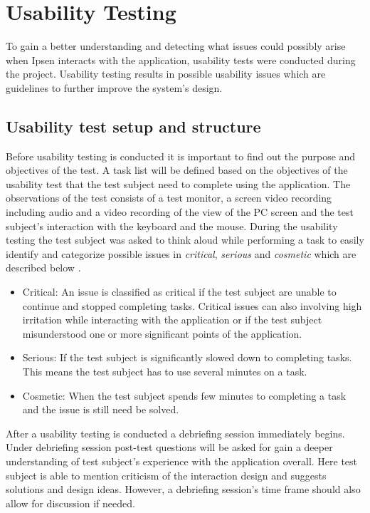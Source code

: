 \section{Usability Testing} \label{sec:usabilitytesting}

To gain a better understanding and detecting what issues could possibly arise when Ipsen interacts with the application, usability tests were conducted during the project. 
Usability testing results in possible usability issues which are guidelines to further improve the system's design. 

\subsection{Usability test setup and structure}
Before usability testing is conducted it is important to find out the purpose and objectives of the test. 
A task list will be defined based on the objectives of the usability test that the test subject need to complete using the application. The observations of the test consists of a test monitor, a screen video recording including audio and a video recording of the view of the PC screen and the test subject's interaction with the keyboard and the mouse. 
During the usability testing the test subject was asked to think aloud while performing a task to easily identify and categorize possible issues in \textit{critical}, \textit{serious} and \textit{cosmetic} which are described below \citep[p.~154]{brugervenligtwebdesign}.

\begin{itemize}
  \item Critical: An issue is classified as critical if the test subject are unable to continue and stopped completing tasks.
Critical issues can also involving high irritation while interacting with the application or if the test subject misunderstood one or more significant points of the application.
  \item Serious: If the test subject is significantly slowed down to completing tasks. 
This means the test subject has to use several minutes on a task.
	\item Cosmetic: When the test subject spends few minutes to completing a task and the issue is still need be solved. 
\end{itemize}

After a usability testing is conducted a debriefing session immediately  begins. 
Under debriefing session post-test questions will be asked for gain a deeper understanding of test subject's experience with the application overall. 
Here test subject is able to mention criticism of the interaction design and suggests solutions and design ideas. 
However, a debriefing session's time frame should also allow for discussion if needed. 


